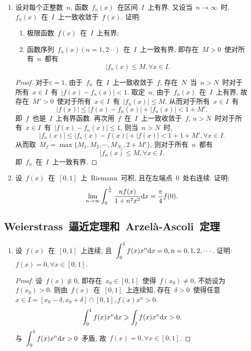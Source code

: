 \documentclass[UTF8,a4paper,20pt]{article}
\begin{document}
\begin{enumerate}[1.]
\item 设对每个正整数~$n$, 函数~$f_n(x)$~在区间~$I$~上有界. 又设当~$n\to\infty$~时, $f_n(x)$~在~$I$~上一致收敛于~$f(x)$. 证明:
	\begin{enumerate}[(1)]
		\item 极限函数~$f(x)$~在~$I$~上有界;
		\item 函数序列~$f_n(x)(n=1,2\cdots)$~在~$I$~上一致有界, 即存在~$M>0$~使对所有~$n$~都有
	\[|f_n(x)\leqslant M, \forall x\in I.\]
	\end{enumerate}
\begin{proof}
	对于$\varepsilon=1$, 由于~$f_n$~在~$I$~上一致收敛于~$f$, 存在~$N$~当~$n>N$~时对于所有~$x\in I$~有~$|f(x)-f_n(x)|<1$. 取定~$n$, 由于~$f_n(x)$~在~$I$~上有界, 故存在~$M'>0$~使对于所有~$x\in I$~有~$|f_n(x)|\leqslant M$, 从而对于所有~$x\in I$~有
\[ |f(x)|\leqslant|f(x)-f_n(x)|+|f_n(x)|<1+M'.\]
即~$f$~也是~$I$~上有界函数. 再次用~$f$~在~$I$~上一致收敛于~$f$, $n>N$~时对于所有~$x\in I$~有~$|f(x)-f_n(x)|\leqslant 1$, 则当~$n>N$~时, 
\[ |f_n(x)|\leqslant|f_n(x)-f(x)|+|f(x)|<1+1+M', \forall x\in I.\]
从而取~$M_f=\max\{M_1,M_2,\cdots, M_{N_1}, 2+M'\}$, 则对于所有~$n$~都有
\[|f_n(x)\leqslant M, \forall x\in I.\]
即~$f_n$~在~$I$~上一致有界.
\end{proof}

\item 设~$f(x)$~在~$[0,1]$~上~Riemann~可积, 且在左端点~$0$~处右连续. 证明:
\[ \lim\limits_{n\to\infty}\int_0^\frac{1}{n}\dfrac{nf(x)}{1+n^2x^2}\mathrm{d}x=\dfrac{\pi}{4}f(0).\]
\end{enumerate}

\clearpage
\subsection{Weierstrass~逼近定理和~Arzel\`a-Ascoli~定理}
\begin{enumerate}[1.]
\item 设~$f(x)$~在~$[0,1]$~上连续, 且~$\displaystyle \int_0^1 f(x)x^n\mathrm{d}x=0, n=0,1,2,\cdots$. 证明: $f(x)=0, \forall x\in[0,1]$.
\begin{proof}
	设~$f(x)\not\equiv0$, 即存在~$x_0\in[0,1]$~使得~$f(x_0)\neq 0$, 不妨设为~$f(x_0)>0$. 则由~$f(x)$~在~$[0,1]$~上连续知, 存在~$\delta>0$~使得任意~$x\in I=[x_0-\delta,x_0+\delta]\cap[0,1], f(x)x^n>0$. 
\[\int_0^1 f(x)x^n\mathrm{d}x\geqslant\int_{I} f(x)x^n\mathrm{d}x>0.\]
与~$\displaystyle \int_0^1 f(x)x^n\mathrm{d}x>0$~矛盾, 故~$f(x)=0, \forall x\in[0,1]$.
\end{proof}
\end{enumerate}
\clearpage
\end{document}
